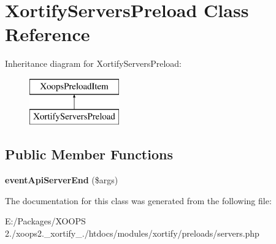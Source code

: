 \hypertarget{class_xortify_servers_preload}{\section{Xortify\-Servers\-Preload Class Reference}
\label{class_xortify_servers_preload}
}
Inheritance diagram for Xortify\-Servers\-Preload\-:\begin{figure}[H]
\begin{center}
\leavevmode
\includegraphics[height=2.000000cm]{class_xortify_servers_preload}
\end{center}
\end{figure}
\subsection*{Public Member Functions}
\begin{DoxyCompactItemize}
\item 
\hypertarget{class_xortify_servers_preload_a4419985b1d133a001b47833c48801279}{{\bfseries event\-Api\-Server\-End} (\$args)}\label{class_xortify_servers_preload_a4419985b1d133a001b47833c48801279}

\end{DoxyCompactItemize}


The documentation for this class was generated from the following file\-:\begin{DoxyCompactItemize}
\item 
E\-:/\-Packages/\-X\-O\-O\-P\-S 2./xoops2.\-\_\-xortify\-\_./htdocs/modules/xortify/preloads/servers.\-php\end{DoxyCompactItemize}
